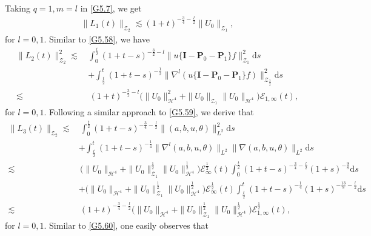 \documentclass[reqno,11pt]{amsart}
\theoremstyle{plain}
\numberwithin{equation}{section}
\begin{document}
Taking $q=1,m=l$ in \eqref{G5.7}, we get
\begin{align}\label{G5.70}
\| L_1(t)\|_{\mathcal{Z}_2}\lesssim (1+t)^{-\frac{3}{4}-\frac{l}{2}}
\|U_0\|_{\mathcal{Z}_{1}},
\end{align}
for $l=0,1$. Similar to \eqref{G5.58}, we have
\begin{align}\label{G5.71}
\| L_2(t)\|_{\mathcal{Z}_2}^2\lesssim\,& \int_0^{\frac{t}{2}}(1+t-s)^{-\frac{3}{2}-l}
\| u\{\mathbf{I}-\mathbf{P}_0-\mathbf{P}_1\}f\|_{\mathcal{Z}_1}^2\mathrm{d}s\nonumber\\
&+ \int_{\frac{t}{2}}^t(1+t-s)^{-\frac{1}{2}}
\|\nabla^l ( u\{\mathbf{I}-\mathbf{P}_0-\mathbf{P}_1\}f)\|_{\mathcal{Z}_{\frac{3}{2}}}^2\mathrm{d}s\nonumber\\
\lesssim &\,(1+t)^{-\frac{3}{2}-l}\big(\|U_0\|_{\mathcal{H}^4}^2+\|U_0\|_{\mathcal{Z}_1}\|U_0\|_{\mathcal{H}^4}   \big)\mathcal{E}_{1,\infty}(t),    
\end{align}
for $l=0,1$.
Following a similar approach to \eqref{G5.59}, we derive that 
\begin{align}\label{G5.72}
\| L_3(t)\|_{\mathcal{Z}_2}
\lesssim&\, \int_0^{\frac{t}{2}}(1+t-s)^{-\frac{3}{4}-\frac{l}{2}}\|(a,b,u,\theta)\|_{L^2}^2 
  \mathrm{d}s\nonumber\\
&+ \int_{\frac{t}{2}}^t(1+t-s)^{-\frac{1}{4}}\|\nabla^l(a,b,u,\theta)\|_{L^2}\|\nabla(a,b,u,\theta)\|_{L^2}\mathrm{d}s\nonumber\\
\lesssim&\, \big(\|U_0\|_{\mathcal{H}^4}+\|U_0\|_{\mathcal{Z}_1}^{\frac{1}{2}}\|U_0\|_{\mathcal{H}^4}^{\frac{1}{2}}   \big)\mathcal{E}^{\frac{1}{2}}_{\infty}(t)\int_0^{\frac{t}{2}}(1+t-s)^{-\frac{3}{4}-\frac{l}{2}}(1+s)^{-\frac{9}{8}}
  \mathrm{d}s\nonumber\\
&+ \big(\|U_0\|_{\mathcal{H}^4}+\|U_0\|_{\mathcal{Z}_1}^{\frac{1}{2}}\|U_0\|_{\mathcal{H}^4}^{\frac{1}{2}}   \big)\mathcal{E}^{\frac{1}{2}}_{\infty}(t)\int_{\frac{t}{2}}^{t}(1+t-s)^{-\frac{1}{4}}(1+s)^{-\frac{13}{8}-\frac{l}{2}}
  \mathrm{d}s\nonumber\\
\lesssim&\, (1+t)^{-\frac{3}{4}-\frac{l}{2}}\big(\|U_0\|_{\mathcal{H}^4}+\|U_0\|_{\mathcal{Z}_1}^{\frac{1}{2}}\|U_0\|_{\mathcal{H}^4}^{\frac{1}{2}}   \big)\mathcal{E}^{\frac{1}{2}}_{1,\infty}(t),
\end{align}
for $l=0,1$.
Similar to \eqref{G5.60}, one easily observes that   
\end{document}
